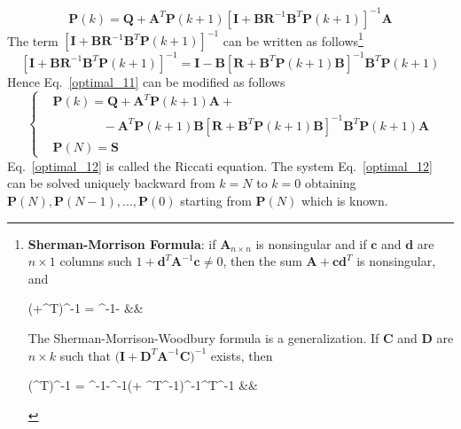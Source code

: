 \documentclass[12pt,a4paper,oneside]{book}
\begin{document}
\begin{onehalfspace}
\begin{equation}
	\mathbf{P}(k)=\mathbf{Q}+\mathbf{A}^T\mathbf{P}(k+1)\left[ 
	\mathbf{I}+\mathbf{B}\mathbf{R}^{-1}\mathbf{B}^T\mathbf{P}(k+1)\right]^{-1} 
	\mathbf{A}
\end{equation}
The term $\left[ 
\mathbf{I}+\mathbf{B}\mathbf{R}^{-1}\mathbf{B}^T\mathbf{P}(k+1)\right]^{-1}$ 
can be written as follows\footnote{\textbf{Sherman-Morrison Formula}: if 
	$\mathbf{A}_{n\times n}$ is nonsingular and if $\mathbf{c}$ and $\mathbf{d}$ 
	are $n\times 1$ columns such $1+\mathbf{d}^T\mathbf{A}^{-1}\mathbf{c}\ne0$, 
	then the sum $\mathbf{A+cd}^T$ is nonsingular, and 
	\begin{flalign} 
		\big(+^T\big)^{-1}  = 
		^{-1}- &&
	\end{flalign}
	\noindent The Sherman-Morrison-Woodbury formula is a generalization. If 
	$\mathbf{C}$ and $\mathbf{D}$ are $n\times k$ such that 
	$\big(\mathbf{I}+\mathbf{D}^T\mathbf{A}^{-1}\mathbf{C}\Big)^{-1}$ exists, then 
	\begin{flalign}
		\Big(^T\Big)^{-1} = 
		^{-1}-^{-1}\Big(+ ^T^{-1}\Big)^{-1}^T^{-1} &&
	\end{flalign}
}
\begin{equation*}
	\left[ 
	\mathbf{I}+\mathbf{B}\mathbf{R}^{-1}\mathbf{B}^T\mathbf{P}(k+1)\right]^{-1} 
	= \mathbf{I} - \mathbf{B}\left[ 
	\mathbf{R}+\mathbf{B}^T\mathbf{P}(k+1)\mathbf{B}\right]^{-1}\mathbf{B}^T\mathbf{P}(k+1)
\end{equation*}
Hence Eq.~\eqref{optimal_11} can be modified as follows
\begin{equation}\label{optimal_12}
	\left\lbrace \begin{aligned}
		&\mathbf{P}(k) =\mathbf{Q}+\mathbf{A}^T\mathbf{P}(k+1)\mathbf{A}+ 
		\\[6pt]
		& \qquad\qquad -\mathbf{A}^T\mathbf{P}(k+1)\mathbf{B}\left[ 
		\mathbf{R}+\mathbf{B}^T\mathbf{P}(k+1)\mathbf{B}\right]^{-1}\mathbf{B}^T\mathbf{P}(k+1)
		\mathbf{A} \\[6pt]
		&\mathbf{P}(N) =\mathbf{S}
	\end{aligned}\right. 
\end{equation}
Eq.~\eqref{optimal_12} is called the Riccati equation. The system 
Eq.~\eqref{optimal_12} can be solved uniquely backward from $k=N$ to $k=0$ 
obtaining $\mathbf{P}(N), \mathbf{P}(N-1), ... ,\mathbf{P}(0)$ starting from 
$\mathbf{P}(N)$ which is known. 


\end{onehalfspace}
\end{document}
